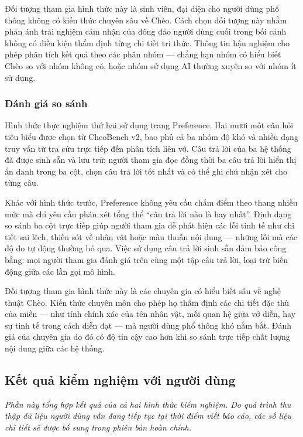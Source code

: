 Đối tượng tham gia hình thức này là sinh viên, đại diện cho người dùng phổ thông không có kiến thức chuyên sâu về Chèo. Cách chọn đối tượng này nhằm phản ánh trải nghiệm cảm nhận của đông đảo người dùng cuối trong bối cảnh không có điều kiện thẩm định từng chi tiết tri thức. Thông tin hậu nghiệm cho phép phân tích kết quả theo các phân nhóm --- chẳng hạn nhóm có hiểu biết Chèo so với nhóm không có, hoặc nhóm sử dụng AI thường xuyên so với nhóm ít sử dụng.

\subsubsection{Đánh giá so sánh}
\label{sec:preference_study}

Hình thức thực nghiệm thứ hai sử dụng trang Preference. Hai mươi mốt câu hỏi tiêu biểu được chọn từ CheoBench v2, bao phủ cả ba nhóm độ khó và nhiều dạng truy vấn từ tra cứu trực tiếp đến phân tích liên vở. Câu trả lời của ba hệ thống đã được sinh sẵn và lưu trữ; người tham gia đọc đồng thời ba câu trả lời hiển thị ẩn danh trong ba cột, chọn câu trả lời tốt nhất và có thể ghi chú nhận xét cho từng câu.

Khác với hình thức trước, Preference không yêu cầu chấm điểm theo thang nhiều mức mà chỉ yêu cầu phán xét tổng thể ``câu trả lời nào là hay nhất''. Định dạng so sánh ba cột trực tiếp giúp người tham gia dễ phát hiện các lỗi tinh tế như chi tiết sai lệch, thiếu sót về nhân vật hoặc mâu thuẫn nội dung --- những lỗi mà các độ đo tự động thường bỏ qua. Việc sử dụng câu trả lời sinh sẵn đảm bảo công bằng: mọi người tham gia đánh giá trên cùng một tập câu trả lời, loại trừ biến động giữa các lần gọi mô hình.

Đối tượng tham gia hình thức này là các chuyên gia có hiểu biết sâu về nghệ thuật Chèo. Kiến thức chuyên môn cho phép họ thẩm định các chi tiết đặc thù của miền --- như tính chính xác của tên nhân vật, mối quan hệ giữa vở diễn, hay sự tinh tế trong cách diễn đạt --- mà người dùng phổ thông khó nắm bắt. Đánh giá của chuyên gia do đó có độ tin cậy cao hơn khi so sánh trực tiếp chất lượng nội dung giữa các hệ thống.

\subsection{Kết quả kiểm nghiệm với người dùng}

\textit{Phần này tổng hợp kết quả của cả hai hình thức kiểm nghiệm. Do quá trình thu thập dữ liệu người dùng vẫn đang tiếp tục tại thời điểm viết báo cáo, các số liệu chi tiết sẽ được bổ sung trong phiên bản hoàn chỉnh.}

